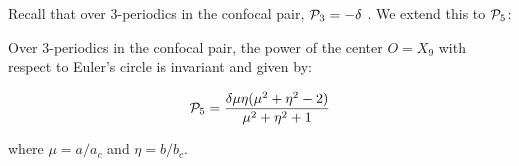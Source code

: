 Recall that over 3-periodics in the confocal pair, $\P_3=-\delta$ \cite[Thm. 3]{garcia2020-new-properties}. We extend this to $\P_5$:

\begin{proposition}
 Over 3-periodics in the confocal pair, the power of the center $O=X_9$ with respect to Euler's circle is invariant and given by:




\[ \P_5 =  \frac{\delta \mu \eta (\mu^2 + \eta^2 - 2 )}{\mu^2 + \eta^2 + 1} \]

\noindent where $\mu= {a}/{a_c}$ and $\eta= {b}/{b_c}$.
\end{proposition}

